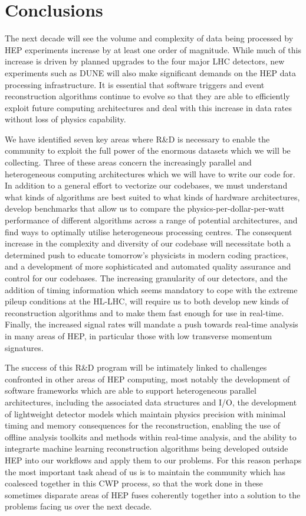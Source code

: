 \section{Conclusions}

The next decade will see the volume and complexity of data being processed by HEP experiments increase by at least one order of magnitude. While much of this increase is driven by planned upgrades to the four major LHC detectors, new experiments such as DUNE will also make significant demands on the HEP data processing infrastructure. It is essential that software triggers and event reconstruction algorithms continue to evolve so that they are able to efficiently exploit future computing architectures and deal with this increase in data rates without loss of physics capability. 

We have identified seven key areas where R\&D is necessary to enable the community to exploit the full power of the enormous datasets which we will be collecting. Three of these areas concern the increasingly parallel and heterogeneous computing architectures which we will have to write our code for. In addition to a general effort to vectorize our codebases, we must understand what kinds of algorithms are best suited to what kinds of hardware architectures, develop benchmarks that allow us to compare the physics-per-dollar-per-watt performance of different algorithms across a range of potential architectures, and find ways to optimally utilise heterogeneous processing centres. The consequent increase in the complexity and diversity of our codebase will necessitate both a determined push to educate tomorrow’s physicists in modern coding practices, and a development of more sophisticated and automated quality assurance and control for our codebases. The increasing granularity of our detectors, and the addition of timing information which seems mandatory to cope with the extreme pileup conditions at the HL-LHC, will require us to both develop new kinds of reconstruction algorithms and to make them fast enough for use in real-time. Finally, the increased signal rates will mandate a push towards real-time analysis in many areas of HEP, in particular those with low transverse momentum signatures.

The success of this R\&D program will be intimately linked to challenges confronted in other areas of HEP computing, most notably the development of software frameworks which are able to support heterogeneous parallel architectures, including the associated data structures and I/O, the development of lightweight detector models which maintain physics precision with minimal timing and memory consequences for the reconstruction, enabling the use of offline analysis toolkits and methods within real-time analysis, and the ability to integrarte machine learning reconstruction algorithms being developed outside HEP into our workflows and apply them to our problems. For this reason perhaps the most important task ahead of us is to maintain the community which has coalesced together in this CWP process, so that the work done in these sometimes disparate areas of HEP fuses coherently together into a solution to the problems facing us over the next decade.

